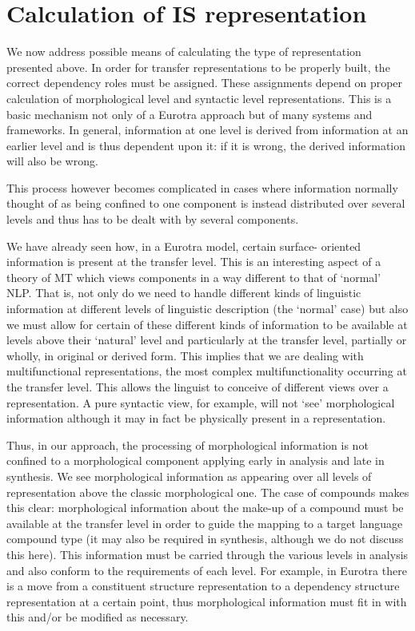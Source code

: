 \section{Calculation of IS representation}

We  now  address  possible  means  of  calculating  the  type  of 
representation    presented   above.    In  order  for   transfer 
representations   to    be   properly    built,    the    correct  
dependency  roles  must  be  assigned.  These assignments  depend   
on     proper    calculation    of  morphological  level      and 
syntactic  level  representations.  This is a basic mechanism not 
only of a Eurotra approach but of many systems and frameworks. In 
general,  information at one level is derived from information at 
an earlier level and is thus dependent upon it:  if it is  wrong, 
the derived information will also be wrong.

This   process   however  becomes  complicated  in  cases   where 
information  normally  thought  of  as  being  confined  to   one 
component is instead distributed over several levels and thus has 
to be dealt with by several components. 

We have already seen how,  in a Eurotra model,  certain  surface-
oriented information is present at the transfer level. This is an 
interesting  aspect of a theory of MT which views components in a 
way different to that of `normal' NLP.  That is,  not only do  we 
need  to  handle  different kinds of  linguistic  information  at 
different  levels  of linguistic description (the `normal'  case) 
but  also we must allow for certain of these different  kinds  of 
information to be available at levels above their `natural' level 
and particularly at the transfer level,  partially or wholly,  in 
original or derived form.  This implies that we are dealing  with 
multifunctional     representations,     the     most     complex 
multifunctionality  occurring at the transfer level.  This allows 
the   linguist   to   conceive  of   different   views   over   a 
representation.  A  pure syntactic view,  for example,  will  not 
`see'  morphological  information  although  it may  in  fact  be 
physically present in a representation.

Thus,   in   our  approach,   the  processing  of   morphological 
information is not confined to a morphological component applying 
early in analysis and late in synthesis.    We see  morphological 
information as appearing over  all levels of representation above 
the  classic morphological one.  The case of compounds makes this 
clear:  morphological information about the make-up of a compound 
must  be  available at the transfer level in order to  guide  the 
mapping  to  a  target language compound type  (it  may  also  be 
required  in  synthesis,  although we do not discuss this  here). 
This  information must be carried through the various  levels  in 
analysis and also conform to the requirements of each level.  For 
example,  in Eurotra there is a move from a constituent structure 
representation  to  a  dependency structure representation  at  a 
certain  point,  thus morphological information must fit in  with 
this and/or be modified as necessary. 

